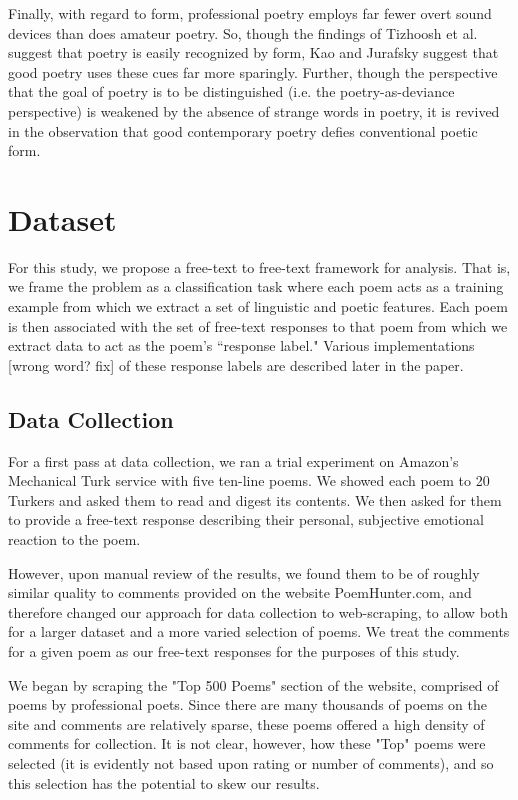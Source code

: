 \documentclass[11pt]{article}
\begin{document}
Finally, with regard to form, professional poetry employs far fewer overt sound devices than does amateur poetry. So, though the findings of Tizhoosh et al. suggest that poetry is easily recognized by form, Kao and Jurafsky suggest that good poetry uses these cues far more sparingly. Further, though the perspective that the goal of poetry is to be distinguished (i.e. the poetry-as-deviance perspective) is weakened by the absence of strange words in poetry, it is revived in the observation that good contemporary poetry defies conventional poetic form.

\section{Dataset}
For this study, we propose a free-text to free-text framework for analysis. That is, we frame the problem as a classification task where each poem acts as a training example from which we extract a set of linguistic and poetic features. Each poem is then associated with the set of free-text responses to that poem from which we extract data to act as the poem's ``response label." Various implementations [wrong word? fix] of these response labels are described later in the paper.

\subsection*{Data Collection}
For a first pass at data collection, we ran a trial experiment on Amazon's Mechanical Turk service with five ten-line poems. We showed each poem to 20 Turkers and asked them to read and digest its contents. We then asked for them to provide a free-text response describing their personal, subjective emotional reaction to the poem. 

However, upon manual review of the results, we found them to be of roughly similar quality to comments provided on the website PoemHunter.com, and therefore changed our approach for data collection to web-scraping, to allow both for a larger dataset and a more varied selection of poems. We treat the comments for a given poem as our free-text responses for the purposes of this study.

We began by scraping the "Top 500 Poems" section of the website, comprised of poems by professional poets. Since there are many thousands of poems on the site and comments are relatively sparse, these poems offered a high density of comments for collection. It is not clear, however, how these "Top" poems were selected (it is evidently not based upon rating or number of comments), and so this selection has the potential to skew our results.
\end{document}

